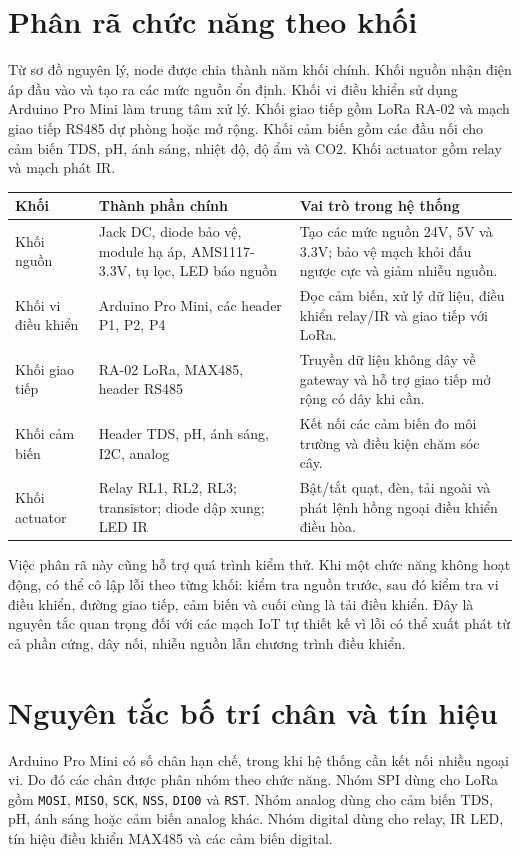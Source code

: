 \section{Phân rã chức năng theo khối}
Từ sơ đồ nguyên lý, node được chia thành năm khối chính. Khối nguồn nhận điện áp đầu vào và tạo ra các mức nguồn ổn định. Khối vi điều khiển sử dụng Arduino Pro Mini làm trung tâm xử lý. Khối giao tiếp gồm LoRa RA-02 và mạch giao tiếp RS485 dự phòng hoặc mở rộng. Khối cảm biến gồm các đầu nối cho cảm biến TDS, pH, ánh sáng, nhiệt độ, độ ẩm và CO2. Khối actuator gồm relay và mạch phát IR.

\begin{longtable}{|p{3.5cm}|p{4.2cm}|p{5.2cm}|}
\hline
\textbf{Khối} & \textbf{Thành phần chính} & \textbf{Vai trò trong hệ thống} \\
\hline
Khối nguồn & Jack DC, diode bảo vệ, module hạ áp, AMS1117-3.3V, tụ lọc, LED báo nguồn & Tạo các mức nguồn 24V, 5V và 3.3V; bảo vệ mạch khỏi đấu ngược cực và giảm nhiễu nguồn. \\
\hline
Khối vi điều khiển & Arduino Pro Mini, các header P1, P2, P4 & Đọc cảm biến, xử lý dữ liệu, điều khiển relay/IR và giao tiếp với LoRa. \\
\hline
Khối giao tiếp & RA-02 LoRa, MAX485, header RS485 & Truyền dữ liệu không dây về gateway và hỗ trợ giao tiếp mở rộng có dây khi cần. \\
\hline
Khối cảm biến & Header TDS, pH, ánh sáng, I2C, analog & Kết nối các cảm biến đo môi trường và điều kiện chăm sóc cây. \\
\hline
Khối actuator & Relay RL1, RL2, RL3; transistor; diode dập xung; LED IR & Bật/tắt quạt, đèn, tải ngoài và phát lệnh hồng ngoại điều khiển điều hòa. \\
\hline
\end{longtable}

Việc phân rã này cũng hỗ trợ quá trình kiểm thử. Khi một chức năng không hoạt động, có thể cô lập lỗi theo từng khối: kiểm tra nguồn trước, sau đó kiểm tra vi điều khiển, đường giao tiếp, cảm biến và cuối cùng là tải điều khiển. Đây là nguyên tắc quan trọng đối với các mạch IoT tự thiết kế vì lỗi có thể xuất phát từ cả phần cứng, dây nối, nhiễu nguồn lẫn chương trình điều khiển.

\section{Nguyên tắc bố trí chân và tín hiệu}
Arduino Pro Mini có số chân hạn chế, trong khi hệ thống cần kết nối nhiều ngoại vi. Do đó các chân được phân nhóm theo chức năng. Nhóm SPI dùng cho LoRa gồm \texttt{MOSI}, \texttt{MISO}, \texttt{SCK}, \texttt{NSS}, \texttt{DIO0} và \texttt{RST}. Nhóm analog dùng cho cảm biến TDS, pH, ánh sáng hoặc cảm biến analog khác. Nhóm digital dùng cho relay, IR LED, tín hiệu điều khiển MAX485 và các cảm biến digital.

